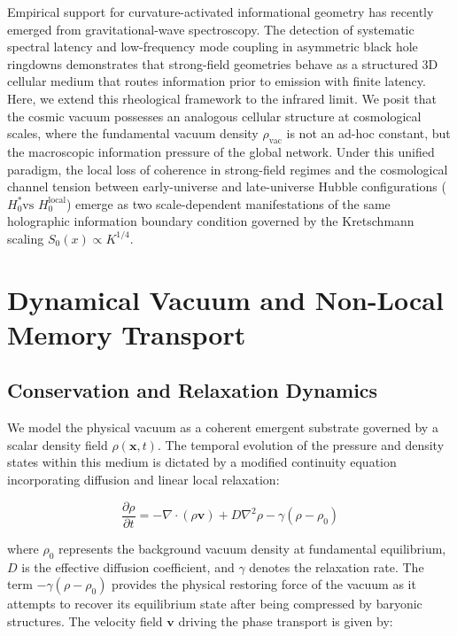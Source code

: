 \documentclass[prd,
               reprint,
               aps,
               preprintnumbers,
               nofootinbib,
               longbibliography,
               floatfix]{revtex4-2}
\begin{document}
Empirical support for curvature-activated informational geometry 
has recently emerged from gravitational-wave spectroscopy. The 
detection of systematic spectral latency and low-frequency mode 
coupling in asymmetric black hole ringdowns 
demonstrates that strong-field geometries behave as a structured 
3D cellular medium that routes information prior to emission 
with finite latency. Here, we extend this rheological framework 
to the infrared limit. We posit that the cosmic vacuum possesses 
an analogous cellular structure at cosmological scales, where the 
fundamental vacuum density $\rho_{\text{vac}}$ is not an ad-hoc 
constant, but the macroscopic information pressure of the global 
network. Under this unified paradigm, the local loss of coherence 
in strong-field regimes and the cosmological channel tension between 
early-universe and late-universe Hubble configurations ($H_0^* \text{
vs } H_0^{\text{local}}$) emerge as two scale-dependent 
manifestations of the same holographic information boundary condition 
governed by the Kretschmann scaling $S_0(x) \propto K^{1/4}$.


\section{Dynamical Vacuum and Non-Local Memory Transport}
\label{sec:dynamical_vacuum}

\subsection{Conservation and Relaxation Dynamics}
We model the physical vacuum as a coherent emergent substrate governed by
a scalar density field $\rho(\mathbf{x}, t)$. The temporal evolution of
the pressure and density states within this medium is dictated by a
modified continuity equation incorporating diffusion and linear local
relaxation:

\begin{equation}
\frac{\partial \rho}{\partial t} = -\nabla \cdot (\rho \mathbf{v}) +
D\nabla^2 \rho - \gamma(\rho - \rho_0)
\end{equation}

where $\rho_0$ represents the background vacuum density at fundamental
equilibrium, $D$ is the effective diffusion coefficient, and $\gamma$
denotes the relaxation rate. The term $-\gamma(\rho - \rho_0)$ provides
the physical restoring force of the vacuum as it attempts to recover its
equilibrium state after being compressed by baryonic structures. The
velocity field $\mathbf{v}$ driving the phase transport is given by:
\end{document}
